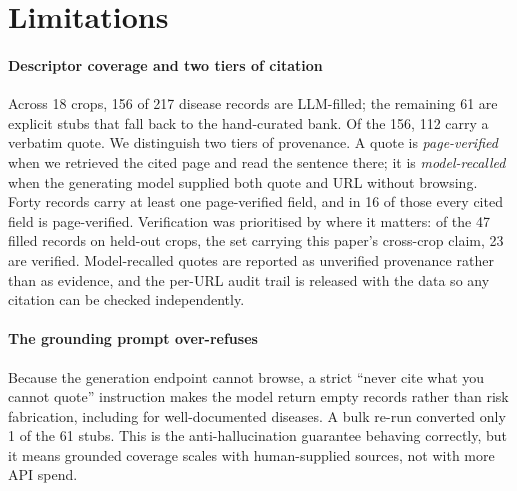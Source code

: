 \documentclass[a4paper,fleqn]{cas-dc}
\begin{document}
\section{Limitations}
\label{sec:limits}

\paragraph{Descriptor coverage and two tiers of citation} Across 18 crops, 156 of 217 disease records
are LLM-filled; the remaining 61 are explicit stubs that fall back to the hand-curated bank. Of the
156, 112 carry a verbatim quote. We distinguish two tiers of provenance. A quote is
\emph{page-verified} when we retrieved the cited page and read the sentence there; it is
\emph{model-recalled} when the generating model supplied both quote and URL without browsing. Forty
records carry at least one page-verified field, and in 16 of those every cited field is
page-verified. Verification was prioritised by where it matters: of the 47 filled records on
held-out crops, the set carrying this paper's cross-crop claim, 23 are verified. Model-recalled
quotes are reported as unverified provenance rather than as evidence, and the per-URL audit trail is
released with the data so any citation can be checked independently.

\paragraph{The grounding prompt over-refuses} Because the generation endpoint cannot browse, a strict
``never cite what you cannot quote'' instruction makes the model return empty records rather than risk
fabrication, including for well-documented diseases. A bulk re-run converted only 1 of the 61 stubs. This
is the anti-hallucination guarantee behaving correctly, but it means grounded coverage scales with
human-supplied sources, not with more API spend.
\end{document}
